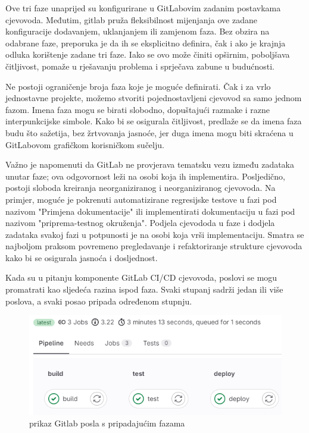 \documentclass[a4paper,12pt,oneside]{article}
\begin{document}
Ove tri faze unaprijed su konfigurirane u GitLabovim zadanim postavkama cjevovoda. Međutim, gitlab pruža fleksibilnost mijenjanja ove zadane konfiguracije dodavanjem, uklanjanjem ili zamjenom faza. Bez obzira na odabrane faze, preporuka je da ih se eksplicitno definira, čak i ako je krajnja odluka korištenje zadane tri faze. Iako se ovo može činiti opširnim, poboljšava čitljivost, pomaže u rješavanju problema i sprječava zabune u budućnosti.

Ne postoji ograničenje broja faza koje je moguće definirati. Čak i za vrlo jednostavne projekte, možemo stvoriti pojednostavljeni cjevovod sa samo jednom fazom. Imena faza mogu se birati slobodno, dopuštajući razmake i razne interpunkcijske simbole. Kako bi se osigurala čitljivost, predlaže se da imena faza budu što  sažetija, bez žrtvovanja jasnoće, jer duga imena mogu biti skraćena u GitLabovom grafičkom korisničkom sučelju.

Važno je napomenuti da GitLab ne provjerava tematsku vezu između zadataka unutar faze; ova odgovornost leži na osobi koja ih implementira. Posljedično, postoji sloboda kreiranja neorganiziranog i neorganiziranog cjevovoda. Na primjer, moguće je pokrenuti automatizirane regresijske testove u fazi pod nazivom "Primjena dokumentacije" ili implementirati dokumentaciju u fazi pod nazivom "priprema-testnog okruženja". Podjela cjevododa u faze i dodjela zadataka svakoj fazi u potpunosti je na osobi koja vrši implementaciju. Smatra se najboljom praksom povremeno pregledavanje i refaktoriranje strukture cjevovoda kako bi se osigurala jasnoća i dosljednost.


Kada su u pitanju komponente GitLab CI/CD cjevovoda, poslovi se mogu promatrati kao sljedeća razina ispod faza. Svaki stupanj sadrži jedan ili više poslova, a svaki posao pripada određenom stupnju.

\begin{figure}[ht!] %
	\centering %
	\includegraphics[scale=0.5]{./Slike/gitlab ci job overview main branch.png} %
	\caption{prikaz Gitlab posla s pripadajućim fazama \label{f:prikaz Gitlab posla s pripadajućim fazama}} %
\end{figure}
\end{document}
